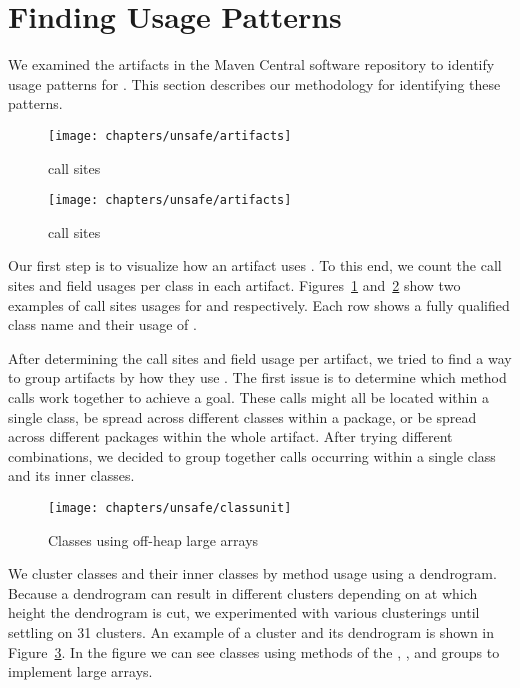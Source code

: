 \section{Finding \smu{} Usage Patterns}
\label{sec:unsafe:methodology}

We examined the artifacts in the Maven Central software repository to identify usage patterns for \unsafe{}.
This section describes our methodology for identifying these patterns. 

\begin{figure}[!ht]
\centering
\texttt{[image: chapters/unsafe/artifacts]}
\caption{ call sites}
\label{fig:appartfingerprint}
\end{figure}

\begin{figure}[!ht]
\centering
\texttt{[image: chapters/unsafe/artifacts]}
\caption{ call sites}
\label{fig:langartfingerprint}
\end{figure}

Our first step is to visualize how an artifact uses \unsafe{}.
To this end, we count the \unsafe{} call sites and field usages per class in each artifact.
Figures~\ref{fig:appartfingerprint} and~\ref{fig:langartfingerprint} show two examples of call sites usages for  and  respectively.
Each row shows a fully qualified class name and their usage of \smu{}.

After determining the call sites and field usage per artifact, we tried to find a way to group artifacts by how they use \smu{}.
The first issue is to determine which method calls work together to achieve a goal.
These calls might all be located within a single class, be spread across different classes within a package, or be spread across different packages within the whole artifact.
After trying different combinations, we decided to group together calls occurring within a single class and its inner classes.

\begin{figure}[!ht]
\centering
\texttt{[image: chapters/unsafe/classunit]}
\caption{Classes using off-heap large arrays}
\label{fig:classunitfingerprint}
\end{figure}

We cluster classes and their inner classes by \unsafe{} method usage using a dendrogram.
Because a dendrogram can result in different clusters depending on at which height the dendrogram is cut,
we experimented with various clusterings until settling on 31 clusters.
An example of a cluster and its dendrogram is shown in Figure~\ref{fig:classunitfingerprint}.
In the figure we can see classes using methods of the , , and  groups to implement large arrays.

